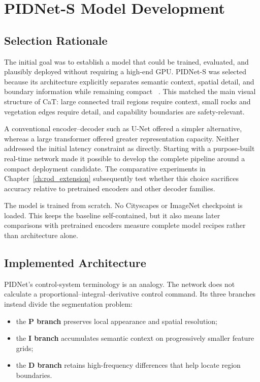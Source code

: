 \chapter{PIDNet-S Model Development}
\label{ch:pidnet}

\section{Selection Rationale}

The initial goal was to establish a model that could be trained, evaluated,
and plausibly deployed without requiring a high-end GPU. PIDNet-S was selected
because its architecture explicitly separates semantic context, spatial
detail, and boundary information while remaining compact
~\cite{xu2023pidnet}. This matched the main visual structure of CaT: large
connected trail regions require context, small rocks and vegetation edges
require detail, and capability boundaries are safety-relevant.

A conventional encoder--decoder such as U-Net offered a simpler alternative,
whereas a large transformer offered greater representation capacity. Neither
addressed the initial latency constraint as directly. Starting with a
purpose-built real-time network made it possible to develop the complete
pipeline around a compact deployment candidate. The comparative experiments
in Chapter~\ref{ch:rod_extension} subsequently test whether this choice
sacrifices accuracy relative to pretrained encoders and other decoder
families.

The model is trained from scratch. No Cityscapes or ImageNet checkpoint is
loaded. This keeps the baseline self-contained, but it also means later
comparisons with pretrained encoders measure complete model recipes rather
than architecture alone.

\section{Implemented Architecture}

PIDNet's control-system terminology is an analogy. The network does not
calculate a proportional--integral--derivative control command. Its three
branches instead divide the segmentation problem:
\begin{itemize}
  \item the \textbf{P branch} preserves local appearance and spatial
  resolution;
  \item the \textbf{I branch} accumulates semantic context on progressively
  smaller feature grids;
  \item the \textbf{D branch} retains high-frequency differences that help
  locate region boundaries.
\end{itemize}

